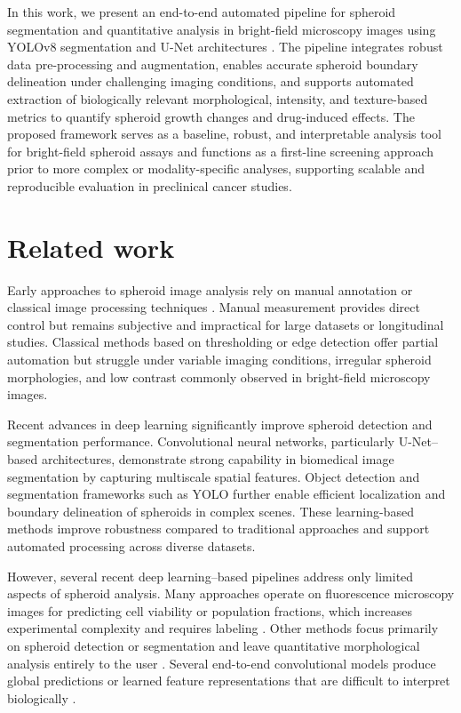 \documentclass[sigconf, nonacm]{acmart}
\begin{document}
In this work, we present an end-to-end automated pipeline for spheroid segmentation and quantitative analysis in bright-field microscopy images using YOLOv8 segmentation and U-Net architectures \cite{ref4,ref5}. The pipeline integrates robust data pre-processing and augmentation, enables accurate spheroid boundary delineation under challenging imaging conditions, and supports automated extraction of biologically relevant morphological, intensity, and texture-based metrics to quantify spheroid growth changes and drug-induced effects. The proposed framework serves as a baseline, robust, and interpretable analysis tool for bright-field spheroid assays and functions as a first-line screening approach prior to more complex or modality-specific analyses, supporting scalable and reproducible evaluation in preclinical cancer studies.

\section{Related work}\label{relatedwork}
Early approaches to spheroid image analysis rely on manual annotation or classical image processing techniques \cite{ref1}. Manual measurement provides direct control but remains subjective and impractical for large datasets or longitudinal studies. Classical methods based on thresholding or edge detection offer partial automation but struggle under variable imaging conditions, irregular spheroid morphologies, and low contrast commonly observed in bright-field microscopy images.

Recent advances in deep learning significantly improve spheroid detection and segmentation performance. Convolutional neural networks, particularly U-Net–based architectures, demonstrate strong capability in biomedical image segmentation \cite{ref2} by capturing multiscale spatial features. Object detection and segmentation frameworks such as YOLO further enable efficient localization and boundary delineation of spheroids in complex scenes. These learning-based methods improve robustness compared to traditional approaches and support automated processing across diverse datasets.

However, several recent deep learning–based pipelines address only limited aspects of spheroid analysis. Many approaches operate on fluorescence microscopy images for predicting cell viability or population fractions, which increases experimental complexity and requires labeling \cite{ref8}. Other methods focus primarily on spheroid detection or segmentation and leave quantitative morphological analysis entirely to the user \cite{ref4}. Several end-to-end convolutional models produce global predictions or learned feature representations that are difficult to interpret biologically \cite{ref9}. 
\end{document}
